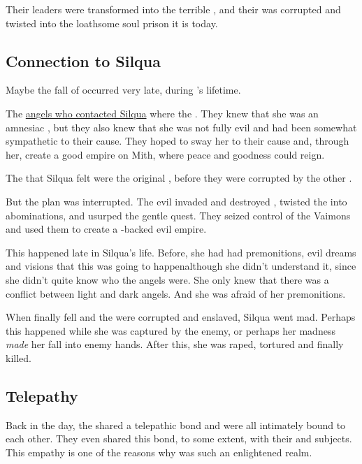 Their leaders were transformed into the terrible \Sephiroth{}, and their \iquin{} was corrupted and twisted into the loathsome soul prison it is today.








\subsection{Connection to Silqua}
Maybe the fall of \Kezerad{} occurred very late, during 's lifetime. 

The \hyperref[Silqua feels angels]{angels who contacted Silqua} where the \Kezeradi. They knew that she was an amnesiac \malach, but they also knew that she was not fully evil and had been somewhat sympathetic to their cause. They hoped to sway her to their cause and, through her, create a good empire on Mith, where peace and goodness could reign. 

The \Sephiroth{} that Silqua felt were the original \Kezeradi{} \Sephiroth, before they were corrupted by the other \resphain. 

But the plan was interrupted. The evil \resphain{} invaded and destroyed \Kezerad, twisted the \Sephiroth{} into abominations, and usurped the \Kezeradiz{} gentle quest. They seized control of the Vaimons and used them to create a \resphan-backed evil empire. 

This happened late in Silqua's life. Before, she had had premonitions, evil dreams and visions that this was going to happen\dash although she didn't understand it, since she didn't quite know who the angels were. She only knew that there was a conflict between light and dark angels. And she was afraid of her premonitions. 

When \Kezerad{} finally fell and the \Sephiroth{} were corrupted and enslaved, Silqua went mad. Perhaps this happened while she was captured by the enemy, or perhaps her madness \emph{made} her fall into enemy hands. After this, she was raped, tortured and finally killed. 







\subsection{Telepathy}
\label{Kezeradi telepathy}
Back in the day, the \Kezeradi{} shared a telepathic bond and were all intimately bound to each other. They even shared this bond, to some extent, with their \human{} and \nephilic{} subjects. This empathy is one of the reasons why \Kezerad{} was such an enlightened realm. 

